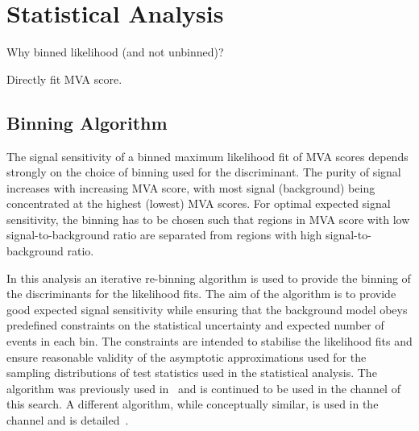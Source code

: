 \section{Statistical Analysis}
\label{sec:statistical_analysis}


Why binned likelihood (and not unbinned)?

Directly fit MVA score.


\subsection{Binning Algorithm}
\label{sec:binning_alg}

The signal sensitivity of a binned maximum likelihood fit of
MVA scores depends strongly on the choice of binning used for the
discriminant. The purity of signal increases with increasing MVA
score, with most signal (background) being concentrated at the highest
(lowest) MVA scores. For optimal expected signal sensitivity, the
binning has to be chosen such that regions in MVA score with low
signal-to-background ratio are separated from regions with high
signal-to-background ratio.

In this analysis an iterative re-binning algorithm is used to provide
the binning of the discriminants for the likelihood fits. The aim of
the algorithm is to provide good expected signal sensitivity while
ensuring that the background model obeys predefined constraints on the
statistical uncertainty and expected number of events in each bin. The
constraints are intended to stabilise the likelihood fits and ensure
reasonable validity of the asymptotic approximations used for the
sampling distributions of test statistics used in the statistical
analysis. The algorithm was previously used
in~\cite{HIGG-2016-16-witherratum} and is continued to be used in the
\hadhad channel of this search. A different algorithm, while
conceptually similar, is used in the \lephad channel and is
detailed~\cite{ATLAS-CONF-2021-030}.

